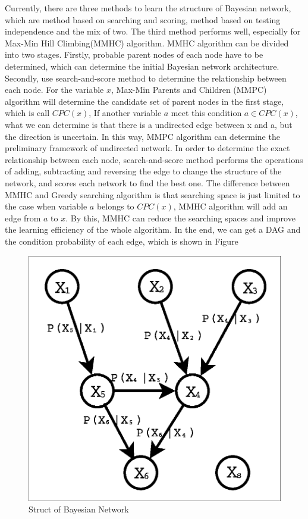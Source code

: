 \documentclass[10pt,twocolumn,letterpaper]{article}
\begin{document}
Currently, there are three methods to learn the structure of Bayesian network, which are method based on searching and scoring, method based on testing independence and the mix of two. The third method performs well, especially for Max-Min Hill Climbing(MMHC) algorithm. MMHC algorithm can be divided into two stages. Firstly, probable parent nodes of each node  have to be determined, which can determine the initial Bayesian network architecture. Secondly, use search-and-score method to determine the relationship between each node. For the variable $x$, Max-Min Parents and Children (MMPC) algorithm will determine the candidate set of parent nodes in the first stage, which is call $CPC(x)$, If another variable $a$ meet this condition $a \in CPC(x)$, what we can determine is that there is a undirected edge between x and a, but the direction is uncertain. In this way, MMPC algorithm can determine the preliminary framework of undirected network. In order to determine the exact relationship between each node, search-and-score method performs the operations of adding, subtracting and reversing the edge to change the structure of the network, and scores each network to find the best one. The difference between MMHC and Greedy searching algorithm is that searching space is just limited to the case when variable $a$ belongs to $CPC(x)$, MMHC algorithm will add an edge from $a$ to $x$. By this, MMHC can reduce the searching spaces and  improve the learning efficiency of the whole algorithm. In the end, we can get a DAG and the condition probability of each edge, which is shown in Figure 
\begin{figure}[ht]
\begin{center}
   \includegraphics[width=0.68\linewidth]{DAG.eps}
\end{center}
   \caption{Struct of Bayesian Network}
\label{fig:BN}
\end{figure}
\end{document}
